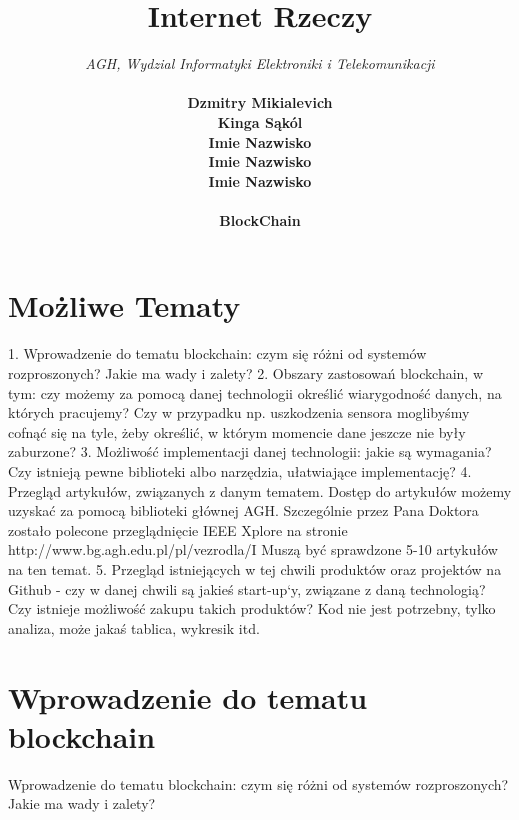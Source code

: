 \documentclass[12pt]{article}
\begin{document}
\title{Internet Rzeczy}
\author{
  \textit{AGH, Wydzial Informatyki Elektroniki i Telekomunikacji} \\ \\
  \textbf{Dzmitry Mikialevich}\\
  \textbf{Kinga Sąkól}\\
  \textbf{Imie Nazwisko}\\
  \textbf{Imie Nazwisko}\\
  \textbf{Imie Nazwisko}\\ \\
  \textbf{BlockChain}
}
\date{ }
\maketitle
\tableofcontents

\newpage

\section{Możliwe Tematy}
1. Wprowadzenie do tematu blockchain: czym się różni od systemów rozproszonych? Jakie ma wady i zalety?
2. Obszary zastosowań blockchain, w tym: czy możemy za pomocą danej technologii określić wiarygodność danych,
na których pracujemy? Czy w przypadku np. uszkodzenia sensora moglibyśmy cofnąć się na tyle, żeby określić, w którym momencie dane jeszcze nie były zaburzone?
3. Możliwość implementacji danej technologii: jakie są wymagania? Czy istnieją pewne biblioteki albo narzędzia, ułatwiające implementację?
4. Przegląd artykułów, związanych z danym tematem. Dostęp do artykułów możemy uzyskać za pomocą biblioteki głównej AGH. Szczególnie przez Pana Doktora zostało polecone przeglądnięcie IEEE Xplore na stronie http://www.bg.agh.edu.pl/pl/vezrodla/I
Muszą być sprawdzone 5-10 artykułów na ten temat.
5. Przegląd istniejących w tej chwili produktów oraz projektów na Github - czy w danej chwili są jakieś start-up`y, związane z daną technologią? Czy istnieje możliwość zakupu takich produktów? Kod nie jest potrzebny, tylko analiza, może jakaś tablica, wykresik itd.

\section{Wprowadzenie do tematu blockchain}

Wprowadzenie do tematu blockchain: czym się różni od systemów rozproszonych? Jakie ma wady i zalety?
\end{document}

